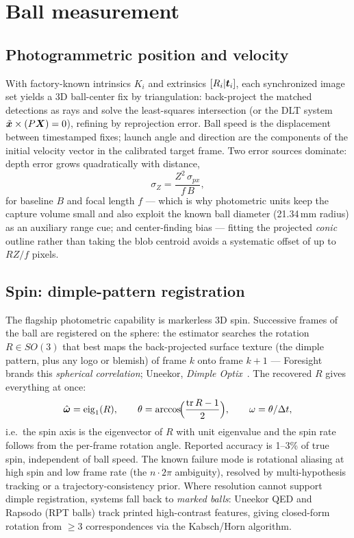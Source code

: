 \section{Ball measurement}

\subsection{Photogrammetric position and velocity}

With factory-known intrinsics $K_i$ and extrinsics $[R_i|\bm{t}_i]$,
each synchronized image set yields a 3D ball-center fix by triangulation:
back-project the matched detections as rays and solve the least-squares
intersection (or the DLT system $\tilde{\bm{x}}\times(P\bm{X})=0$),
refining by reprojection error. Ball speed is the displacement between
timestamped fixes; launch angle and direction are the components of the
initial velocity vector in the calibrated target frame. Two error sources
dominate: depth error grows quadratically with distance,
\begin{equation}
\label{eq:depth}
\sigma_Z = \frac{Z^2\,\sigma_{px}}{f\,B},
\end{equation}
for baseline $B$ and focal length $f$ --- which is why photometric units
keep the capture volume small and also exploit the known ball diameter
(21.34\,mm radius) as an auxiliary range cue; and center-finding bias ---
fitting the projected \emph{conic} outline rather than taking the blob
centroid avoids a systematic offset of up to $RZ/f$ pixels.

\subsection{Spin: dimple-pattern registration}
\label{sec:dimplespin}

The flagship photometric capability is markerless 3D spin. Successive
frames of the ball are registered on the sphere: the estimator searches
the rotation $R\in SO(3)$ that best maps the back-projected surface
texture (the dimple pattern, plus any logo or blemish) of frame $k$ onto
frame $k{+}1$ --- Foresight brands this \emph{spherical correlation};
Uneekor, \emph{Dimple Optix}~\cite{foresightspherical,uneekordimple}.
The recovered $R$ gives everything at once:
\begin{equation}
\label{eq:rotangle}
\hat{\bm{\omega}} = \mathrm{eig}_1(R), \qquad
\theta = \arccos\!\Bigl(\frac{\mathrm{tr}\,R - 1}{2}\Bigr), \qquad
\omega = \theta/\Delta t,
\end{equation}
i.e.\ the spin axis is the eigenvector of $R$ with unit eigenvalue and the
spin rate follows from the per-frame rotation angle. Reported accuracy is
1--3\% of true spin, independent of ball speed. The known failure mode is
rotational aliasing at high spin and low frame rate (the $n\cdot2\pi$
ambiguity), resolved by multi-hypothesis tracking or a
trajectory-consistency prior. Where resolution cannot support dimple
registration, systems fall back to \emph{marked balls}: Uneekor QED and
Rapsodo (RPT balls) track printed high-contrast features, giving closed-form
rotation from $\ge3$ correspondences via the Kabsch/Horn algorithm.


